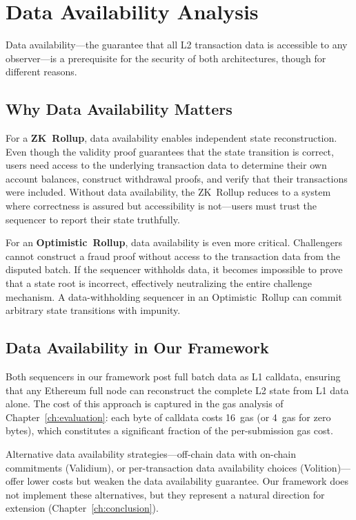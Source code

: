 \section{Data Availability Analysis}

Data availability---the guarantee that all L2 transaction data is accessible to any observer---is a prerequisite for the security of both architectures, though for different reasons.

\subsection{Why Data Availability Matters}

For a \textbf{ZK~Rollup}, data availability enables independent state reconstruction. Even though the validity proof guarantees that the state transition is correct, users need access to the underlying transaction data to determine their own account balances, construct withdrawal proofs, and verify that their transactions were included. Without data availability, the ZK~Rollup reduces to a system where correctness is assured but accessibility is not---users must trust the sequencer to report their state truthfully.

For an \textbf{Optimistic~Rollup}, data availability is even more critical. Challengers cannot construct a fraud proof without access to the transaction data from the disputed batch. If the sequencer withholds data, it becomes impossible to prove that a state root is incorrect, effectively neutralizing the entire challenge mechanism. A data-withholding sequencer in an Optimistic~Rollup can commit arbitrary state transitions with impunity.

\subsection{Data Availability in Our Framework}

Both sequencers in our framework post full batch data as L1 calldata, ensuring that any Ethereum full node can reconstruct the complete L2 state from L1 data alone. The cost of this approach is captured in the gas analysis of Chapter~\ref{ch:evaluation}: each byte of calldata costs 16~gas (or 4~gas for zero bytes), which constitutes a significant fraction of the per-submission gas cost.

Alternative data availability strategies---off-chain data with on-chain commitments (Validium), or per-transaction data availability choices (Volition)---offer lower costs but weaken the data availability guarantee. Our framework does not implement these alternatives, but they represent a natural direction for extension (Chapter~\ref{ch:conclusion}).

